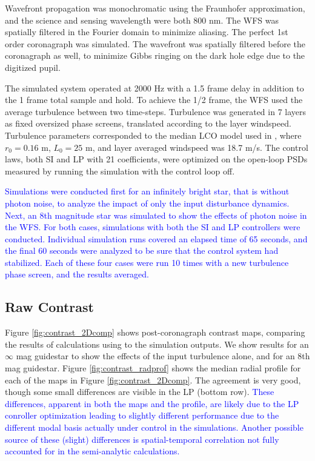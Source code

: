 \documentclass[10pt,preprint]{aastex631}
\newcommand{\jrmadd}[1]{\textcolor{blue}{#1}}
\begin{document}
Wavefront propagation was monochromatic using the Fraunhofer approximation, and the science and sensing wavelength were both 800 nm.  The WFS was spatially filtered in the Fourier domain to minimize aliasing.  The perfect 1st order coronagraph was simulated.  The wavefront was spatially filtered before the coronagraph as well, to minimize Gibbs ringing on the dark hole edge due to the digitized pupil.

The simulated system operated at 2000 Hz with a 1.5 frame delay in addition to the 1 frame total sample and hold.  To achieve the 1/2 frame, the WFS used the average turbulence between two time-steps.  Turbulence was generated in 7 layers as fixed oversized phase screens, translated according to the layer windspeed.   Turbulence parameters corresponded to the median LCO model used in \citet{2018JATIS...4a9001M}, where $r_0 = 0.16$ m, $L_0 = 25$ m, and layer averaged windspeed was 18.7 m/s.  The control laws, both SI and LP with 21 coefficients, were optimized on the open-loop PSDs measured by running the simulation with the control loop off.

\jrmadd{Simulations were conducted first for an infinitely bright star, that is without photon noise, to analyze the impact of only the input disturbance dynamics.  Next, an 8th magnitude star was simulated to show the effects of photon noise in the WFS.  For both cases, simulations with both the SI and LP controllers were conducted.  Individual simulation runs covered an elapsed time of 65 seconds, and the final 60 seconds were analyzed to be sure that the control system had stabilized.  Each of these four cases were run 10 times with a new turbulence phase screen, and the results averaged.}

\subsection{Raw Contrast}
Figure \ref{fig:contrast_2Dcomp} shows post-coronagraph contrast maps, comparing the results of calculations using \citet{2018JATIS...4a9001M} to the simulation outputs.  We show results for an $\infty$ mag guidestar to show the effects of the input turbulence alone, and for an $8$th mag guidestar.   Figure \ref{fig:contrast_radprof} shows the median radial profile for each of the maps in Figure \ref{fig:contrast_2Dcomp}.  The agreement is very good, though some small differences are visible in the LP (bottom row). \jrmadd{These differences, apparent in both the maps and the profile, are likely due to the LP conroller optimization leading to slightly different performance due to the different modal basis actually under control in the simulations. Another possible source of these (slight) differences is spatial-temporal correlation not fully accounted for in the semi-analytic calculations.}
\end{document}
